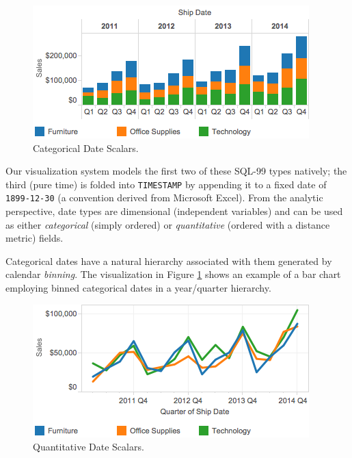 \begin{figure}[ht]
\centering
\includegraphics[width=\columnwidth]{figures/FigureI1}
\caption{Categorical Date Scalars.}
\label{fig:I1}
\end{figure}


Our visualization system models the first two of these SQL-99 types natively; the third (pure time) is folded into \texttt{TIMESTAMP} by appending it to a fixed date of \texttt{1899-12-30} (a convention derived from Microsoft Excel). From the analytic perspective, date types are dimensional (\ie independent variables) and can be used as either \textit{categorical} (simply ordered) or \textit{quantitative} (ordered with a distance metric) fields.

Categorical dates have a natural hierarchy associated with them generated by calendar \textit{binning}. The visualization in Figure \ref{fig:I1} shows an example of a bar chart employing binned categorical dates in a year/quarter hierarchy.

\begin{figure}[ht]
\centering
\includegraphics[width=\columnwidth]{figures/FigureI2}
\caption{Quantitative Date Scalars.}
\label{fig:I2}
\end{figure}



